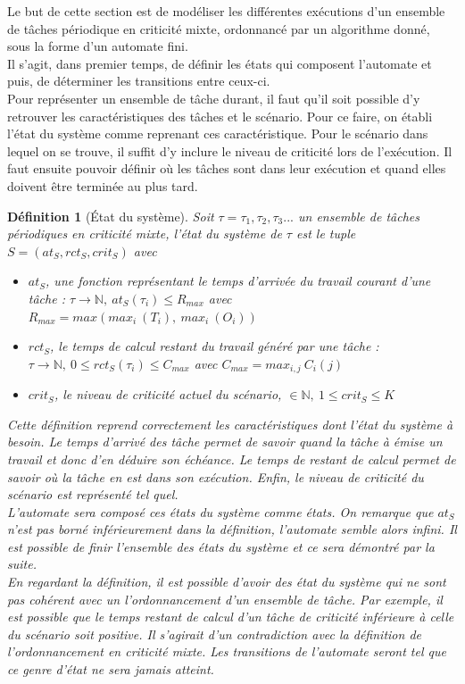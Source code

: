 \documentclass[12pt,a4paper,oneside]{book}
\theoremstyle{break}
\newtheorem{defin}{Définition}[chapter]
\theoremstyle{breakplain}
\begin{document}
Le but de cette section est de modéliser les différentes exécutions d'un ensemble de tâches périodique en criticité mixte, ordonnancé par un algorithme donné, sous la forme d'un automate fini.\\
Il s'agit, dans premier temps, de définir les états qui composent l'automate et puis, de déterminer les transitions entre ceux-ci.\\

Pour représenter un ensemble de tâche durant, il faut qu'il soit possible d'y retrouver les caractéristiques des tâches et le scénario. Pour ce faire, on établi l'état du système comme reprenant ces caractéristique. Pour le scénario dans lequel on se trouve, il suffit d'y inclure le niveau de criticité lors de l'exécution. Il faut ensuite pouvoir définir où les tâches sont dans leur exécution et quand elles doivent être terminée au plus tard.

\begin{defin}[État du système]
Soit $\tau = \tau_1, \tau_2, \tau_3 ...$ un ensemble de tâches périodiques en criticité mixte, l'état du système de $\tau$ est le tuple $S = (at_S, rct_S, crit_S)$ avec

\begin{itemize}
\item $at_S$, une fonction représentant le temps d'arrivée du travail courant d'une tâche : $\tau \rightarrow \mathbb{N},\ at_S(\tau_i) \leq R_{max}$ avec $R_{max} = max(max_i\ (T_i),\ max_i\ (O_i))$
\item $rct_S$, le temps de calcul restant du travail généré par une tâche : $ \tau \rightarrow \mathbb{N},\ 0 \leq rct_S(\tau_i) \leq C_{max}$ avec $C_{max} = max_{i,j}\ C_i(j)$
\item $crit_S$, le niveau de criticité actuel du scénario, $ \in \mathbb{N},\ 1 \leq crit_S \leq K$

\end{itemize}


Cette définition reprend correctement les caractéristiques dont l'état du système à besoin. Le temps d'arrivé des tâche permet de savoir quand la tâche à émise un travail et donc d'en déduire son échéance. Le temps de restant de calcul permet de savoir où la tâche en est dans son exécution. Enfin, le niveau de criticité du scénario est représenté tel quel.\\

L'automate sera composé ces états du système comme états. On remarque que $at_S$ n'est pas borné inférieurement dans la définition, l'automate semble alors infini. Il est possible de finir l'ensemble des états du système et ce sera démontré par la suite.\\
En regardant la définition, il est possible d'avoir des état du système qui ne sont pas cohérent avec un l'ordonnancement d'un ensemble de tâche. Par exemple, il est possible que le temps restant de calcul d'un tâche de criticité inférieure à celle du scénario soit positive. Il s'agirait d'un contradiction avec la définition de l'ordonnancement en criticité mixte. Les transitions de l'automate seront tel que ce genre d'état ne sera jamais atteint.

\end{defin}
\end{document}
